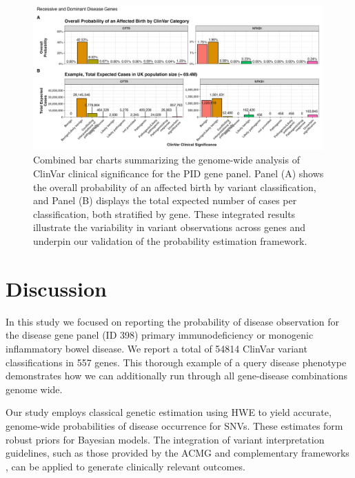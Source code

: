 \begin{figure}[ht]
  \centering
  \includegraphics[width=0.99\textwidth]{../images/all_genes_combined_bar_charts_mini.png}
  \caption{Combined bar charts summarizing the genome-wide analysis of ClinVar clinical significance for the PID gene panel. Panel (A) shows the overall probability of an affected birth by variant classification, and Panel (B) displays the total expected number of cases per classification, both stratified by gene. These integrated results illustrate the variability in variant observations across genes and underpin our validation of the probability estimation framework.}
  \label{fig:all_genes_combined_bar_charts_mini}
\end{figure}

\FloatBarrier
\section{Discussion}
In this study we focused on reporting the probability of disease observation for the  disease gene panel (ID 398) primary immunodeficiency or monogenic inflammatory bowel disease. We report a total of 54814 ClinVar variant classifications in 557 genes. This thorough example of a query disease phenotype demonstrates how we can additionally run through all gene-disease combinations genome wide.

Our study employs classical genetic estimation using HWE to yield accurate, genome-wide probabilities of disease occurrence for SNVs. These estimates form robust priors for Bayesian models. The integration of variant interpretation guidelines, such as those provided by the ACMG \citep{richards2015standards} and complementary frameworks \citep{tavtigian2020fitting,li2017intervar}, can be applied to generate clinically relevant outcomes.

